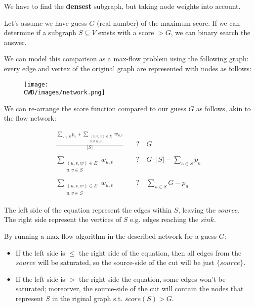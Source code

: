 % 

We have to find the \textbf{densest} subgraph, but taking node weights into account.

Let's assume we have guess $G$ (real number) of the maximum score.
If we can determine if a subgraph $S \subseteq V$ exists with a score $> G$, we can binary search the answer.

We can model this comparison as a max-flow problem using the following graph: every edge and vertex of the original graph are represented with nodes as follows:

\begin{figure}[!tbh]
	\centering
	\texttt{[image: \\CWD/images/network.png]}
\end{figure}

We can re-arrange the score function compared to our guess $G$ as follows, akin to the flow network:

\begin{equation*}
    \begin{split}
        \frac{\sum\limits_{u \in S} {p_u} + \sum\limits_{\substack{(u, v, w) \in E \\ u, v \in S}} {w_{u, v}}}{\lvert S \rvert} \quad & ? \quad G \\ \\
        \sum\limits_{\substack{(u, v, w) \in E \\ u, v \in S}} {w_{u, v}} \quad & ? \quad G \cdot {\lvert S \rvert} - \sum\limits_{u \in S} {p_u} \\ \\
        \sum\limits_{\substack{(u, v, w) \in E \\ u, v \in S}} {w_{u, v}} \quad & ? \quad \sum\limits_{u \in S} {G - p_u}
    \end{split}
\end{equation*}

The left side of the equation represent the edges within $S$, leaving the $source$. The right side represent the vertices of $S$ e.g. edges reaching the $sink$.

By running a max-flow algorithm in the described network for a guess $G$:
\begin{itemize}
    \item If the left side is $\le$ the right side of the equation, then all edges from the $source$ will be saturated, so the source-side of the cut will be just $\{source\}$. \\
    \item If the left side is $>$ the right side the equation, some edges won't be saturated; moreorver, the source-side of the cut will contain the nodes that represent $S$ in the riginal graph s.t. $score(S) > G$. \\
\end{itemize}


